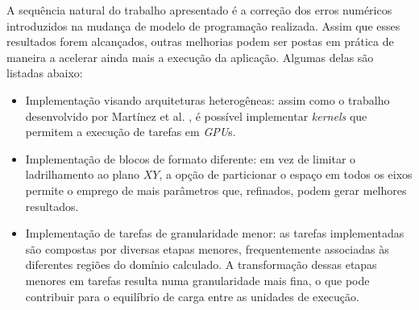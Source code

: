 \documentclass[cic,tc]{iiufrgs}
\begin{document}
A sequência natural do trabalho apresentado é a correção dos erros numéricos introduzidos na mudança de modelo de programação realizada. Assim que esses resultados
forem alcançados, outras melhorias podem ser postas em prática de maneira a acelerar ainda mais a execução da aplicação. Algumas delas são listadas abaixo:

\begin{itemize}
\item{Implementação visando arquiteturas heterogêneas:} assim como o trabalho desenvolvido por Martínez et al. \cite{victor}, é possível implementar \textit{kernels}
  que permitem a execução de tarefas em \textit{GPU}s.
\item{Implementação de blocos de formato diferente:} em vez de limitar o ladrilhamento ao plano $XY$, a opção de particionar o espaço em todos os eixos permite o
  emprego de mais parâmetros que, refinados, podem gerar melhores resultados.
\item{Implementação de tarefas de granularidade menor:} as tarefas implementadas são compostas por diversas etapas menores, frequentemente associadas às diferentes
  regiões do domínio calculado. A transformação dessas etapas menores em tarefas resulta numa granularidade mais fina, o que pode contribuir para o equilíbrio de carga
  entre as unidades de execução.
\end{itemize}
\end{document}
